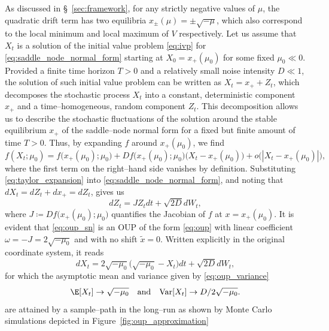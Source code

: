 As discussed in \S~\ref{sec:framework}, for any strictly negative values of $\mu$, the quadratic drift term has two equilibria $x_{\pm}(\mu)=\pm\sqrt{-\mu}$, which also correspond to the local minimum and local maximum of $V$ respectively.
Let us assume that $X_t$ is a solution of the initial value problem \eqref{eq:ivp} for \eqref{eq:saddle_node_normal_form} starting at $X_0 = x_+(\mu_0)$ for some fixed $\mu_0\ll0$.
Provided a finite time horizon $T>0$ and a relatively small noise intensity $D\ll1$, the solution of such initial value problem can be written as $X_t = x_+ + Z_t$, which decomposes the stochastic process $X_t$ into a constant, deterministic component $x_+$ and a time--homogeneous, random component $Z_t$.
This decomposition allows us to describe the stochastic fluctuations of the solution around the stable equilibrium $x_+$ of the saddle--node normal form for a fixed but finite amount of time $T>0$.
Thus, by expanding $f$ around $x_+(\mu_0)$, we find
%
\begin{equation}\label{eq:taylor_expansion}
  f(X_t;\mu_0) = f\bigl(x_+(\mu_0);\mu_0\bigr) + Df\bigl(x_+(\mu_0);\mu_0\bigr)\bigl(X_t - x_+(\mu_0)\bigr) + o\bigr(|X_t - x_+(\mu_0)|\bigr),
\end{equation}
%
where the first term on the right--hand side vanishes by definition.
Substituting \eqref{eq:taylor_expansion} into \eqref{eq:saddle_node_normal_form}, and noting that $dX_t = dZ_t + dx_+ = dZ_t$, gives us
%
\begin{equation}\label{eq:oup_sn}
  dZ_t = JZ_tdt + \sqrt{2D}dW_t,
\end{equation}
%
where $J\coloneqq Df\bigl(x_+(\mu_0);\mu_0\bigr)$ quantifies the Jacobian of $f$ at $x=x_+(\mu_0)$.
It is evident that \eqref{eq:oup_sn} is an OUP of the form \eqref{eq:oup} with linear coefficient $\omega = -J = 2\sqrt{-\mu_0}$ and with no shift $\tilde{x} = 0$.
Written explicitly in the original coordinate system, it reads
%
\begin{equation}\label{eq:shifted_oup_sn}
  dX_t = 2\sqrt{-\mu_0}\bigl(\sqrt{-\mu_0} - X_t\bigr)dt + \sqrt{2D}dW_t,
\end{equation}
%
for which the asymptotic mean and variance given by \eqref{eq:oup_variance}
%
\begin{equation}\label{eq:sn_variance}
  \E[X_t]\to\sqrt{-\mu_0}\quad \text{and} \quad \text{Var}[X_t]\to D/2\sqrt{-\mu_0}.
\end{equation}
%
are attained by a sample--path in the long--run as shown by Monte Carlo simulations depicted in Figure~\ref{fig:oup_approximation}
